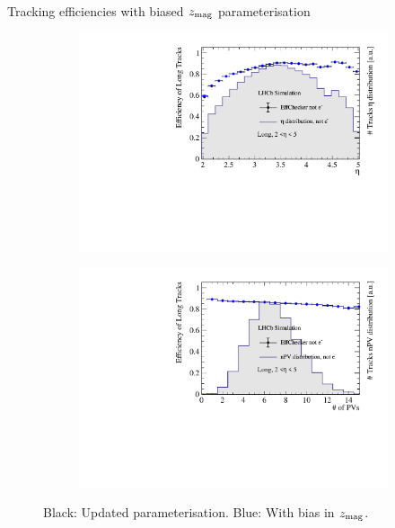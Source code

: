 \documentclass[xcolor={dvipsnames}]{beamer}
\begin{document}
\begin{frame}{Tracking efficiencies with biased $z_{\rm mag}$ parameterisation}
\begin{figure}[htb]
\begin{subfigure}{0.45\textwidth}
      \includegraphics[width=1\textwidth]{Plots/TrackEfficiency_eta_official_MC_new_parameterisation_bias_comparison.pdf}
    \end{subfigure}%
    \begin{subfigure}{0.45\textwidth}
      \includegraphics[width=1\textwidth]{Plots/TrackEfficiency_nPV_official_MC_new_parameterisation_bias_comparison.pdf}
    \end{subfigure}
    \vspace{-0.2cm}
    \caption*{Black: Updated parameterisation. {\color{blue}Blue: With bias in $z_{\rm mag}$.}}
  \end{figure}
\end{frame}
\end{document}
